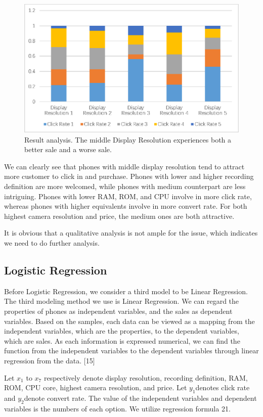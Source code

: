 \begin{figure}[!ht]
	\centering
	\includegraphics[width=360pt]{fig6.eps}
	\caption{ Result analysis. The middle Display Resolution experiences both a better sale and a worse sale.}
	\label{fig6}
\end{figure}


We can clearly see that phones with middle display resolution tend to attract more customer to click in and purchase. Phones with lower and higher recording definition are more welcomed, while phones with medium counterpart are less intriguing. Phones with lower RAM, ROM, and CPU involve in more click rate, whereas phones with higher equivalents involve in more convert rate. For both highest camera resolution and price, the medium ones are both attractive. 

It is obvious that a qualitative analysis is not ample for the issue, which indicates we need to do further analysis. 

\subsection{Logistic Regression}

Before Logistic Regression, we consider a third model to be Linear Regression. The third modeling method we use is Linear Regression. We can regard the properties of phones as independent variables, and the sales as dependent variables. Based on the samples, each data can be viewed as a mapping from the independent variables, which are the properties, to the dependent variables, which are sales. As each information is expressed numerical, we can find the function from the independent variables to the dependent variables through linear regression from the data. [15]

Let $x _ { 1 }$ to $x _ { 7 }$ respectively denote display resolution, recording definition, RAM, ROM, CPU core, highest camera resolution, and price. Let $y _ { 1 }$denotes click rate and $y _ { 2 }$denote convert rate. The value of the independent variables and dependent variables is the numbers of each option. We utilize regression formula 21.

